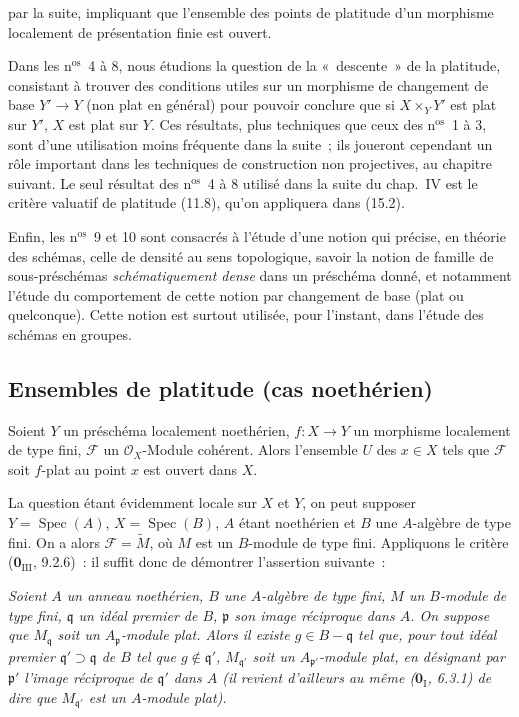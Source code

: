 par la suite, impliquant que l'ensemble des points de platitude d'un morphisme
localement de présentation finie est ouvert.

Dans les n$^\mathrm{os}$~4 à 8, nous étudions la question de la «~descente~» de
la platitude, consistant à trouver des conditions utiles sur un morphisme de
changement de base $Y'\to Y$ (non plat en général) pour pouvoir conclure que si
$X\times_YY'$ est plat sur $Y'$, $X$ est plat sur $Y$. Ces résultats, plus
techniques que ceux des n$^\mathrm{os}$~1 à 3, sont d'une utilisation moins
fréquente dans la suite~; ils joueront cependant un rôle important dans les
techniques de construction non projectives, au chapitre suivant. Le seul
résultat des n$^\mathrm{os}$~4 à 8 utilisé dans la suite du chap.~IV est le
critère valuatif de platitude (11.8), qu'on appliquera dans (15.2).

Enfin, les n$^\mathrm{os}$~9 et 10 sont consacrés à l'étude d'une notion qui
précise, en théorie des schémas, celle de densité au sens topologique, savoir la
notion de famille de sous-préschémas \emph{schématiquement dense} dans un
préschéma donné, et notamment l'étude du comportement de cette notion par
changement de base (plat ou quelconque). Cette notion est surtout utilisée,
pour l'instant, dans l'étude des schémas en groupes.

\subsection{Ensembles de platitude (cas noethérien)}
\label{subsection:IV.11.1-fr}

\begin{theorem}[11.1.1]
\label{IV.11.1.1-fr}
Soient $Y$ un préschéma localement noethérien, $f:X\to Y$ un morphisme
localement de type fini, $\mathcal F$ un $\mathcal O_X$-Module cohérent. Alors
l'ensemble $U$ des $x\in X$ tels que $\mathcal F$ soit $f$-plat au point $x$
est ouvert dans $X$.
\end{theorem}

La question étant évidemment locale sur $X$ et $Y$, on peut supposer
$Y=\operatorname{Spec}(A)$, $X=\operatorname{Spec}(B)$, $A$ étant noethérien et
$B$ une $A$-algèbre de type fini. On a alors $\mathcal F=\widetilde M$, où $M$
est un $B$-module de type fini. Appliquons le critère
($\mathbf 0_{\mathrm{III}}$, 9.2.6)~: il suffit donc de démontrer l'assertion
suivante~:

\begin{env}[11.1.1.1]
\label{IV.11.1.1.1-fr}
\emph{Soient $A$ un anneau noethérien, $B$ une $A$-algèbre de type fini, $M$ un
$B$-module de type fini, $\mathfrak q$ un idéal premier de $B$, $\mathfrak p$
son image réciproque dans $A$. On suppose que $M_{\mathfrak q}$ soit un
$A_{\mathfrak p}$-module plat. Alors il existe $g\in B-\mathfrak q$ tel que,
pour tout idéal premier $\mathfrak q'\supset\mathfrak q$ de $B$ tel que
$g\notin\mathfrak q'$, $M_{\mathfrak q'}$ soit un
$A_{\mathfrak p'}$-module plat, en désignant par $\mathfrak p'$ l'image
réciproque de $\mathfrak q'$ dans $A$ (il revient d'ailleurs au même
($\mathbf 0_{\mathrm I}$, 6.3.1) de dire que $M_{\mathfrak q'}$ est un
$A$-module plat).}
\end{env}


